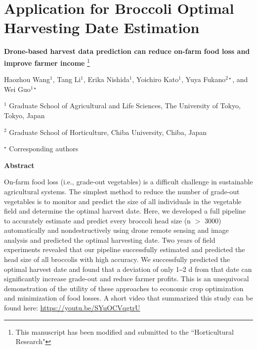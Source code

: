 \chapter{Application for Broccoli Optimal Harvesting Date Estimation}

\begin{center}

\textbf{Drone-based harvest data prediction can reduce on-farm food loss and improve farmer income} \footnote[1]{This manuscript has been modified and submitted to the ``Horticultural Research"}

\end{center}

\noindent Haozhou Wang$^{1}$, Tang Li$^{1}$, Erika Nishida$^{1}$, Yoichiro Kato$^{1}$, Yuya Fukano$^{2\star}$, and Wei Guo$^{1\star}$

\noindent $^{1}$ Graduate School of Agricultural and Life Sciences, The University of Tokyo, Tokyo, Japan

\noindent $^{2}$ Graduate School of Horticulture, Chiba University, Chiba, Japan

\noindent $^{\star}$ Corresponding authors

\hspace*{\fill}

\noindent \textbf{Abstract}

\hspace*{\fill}

On-farm food loss (i.e., grade-out vegetables) is a difficult challenge in sustainable agricultural systems. The simplest method to reduce the number of grade-out vegetables is to monitor and predict the size of all individuals in the vegetable field and determine the optimal harvest date. Here, we developed a full pipeline to accurately estimate and predict every broccoli head size (n $>$ 3000) automatically and nondestructively using drone remote sensing and image analysis and predicted the optimal harvesting date. Two years of field experiments revealed that our pipeline successfully estimated and predicted the head size of all broccolis with high accuracy. We successfully predicted the optimal harvest date and found that a deviation of only 1‒2 d from that date can significantly increase grade-out and reduce farmer profits. This is an unequivocal demonstration of the utility of these approaches to economic crop optimization and minimization of food losses. A short video that summarized this study can be found here: \url{https://youtu.be/SYuOCVqgtrU}


